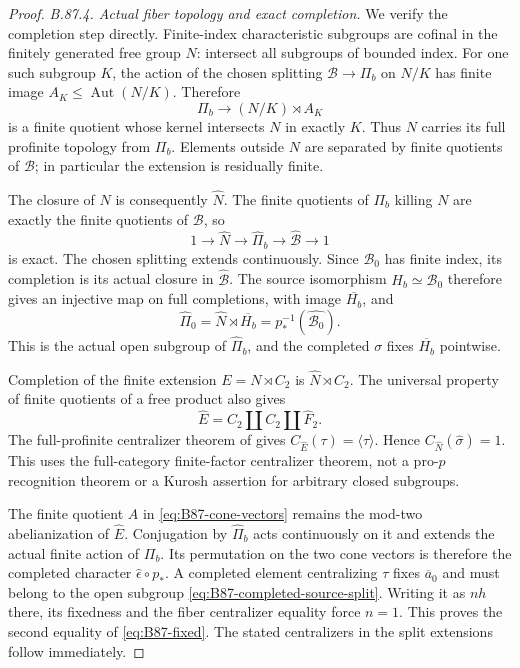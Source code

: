 \begin{proof}
\emph{B.87.4. Actual fiber topology and exact completion.}
We verify the completion step directly. Finite-index characteristic
subgroups are cofinal in the finitely generated free group $N$: intersect
all subgroups of bounded index. For one such subgroup $K$, the action of
the chosen splitting $\mathcal B\to\Pi_b$ on $N/K$ has finite image
$A_K\leq\operatorname{Aut}(N/K)$. Therefore
\[
 \Pi_b\longrightarrow (N/K)\rtimes A_K
\]
is a finite quotient whose kernel intersects $N$ in exactly $K$.
Thus $N$ carries its full profinite topology from $\Pi_b$.
Elements outside $N$ are separated by finite quotients of $\mathcal B$;
in particular the extension is residually finite.

The closure of $N$ is consequently $\widehat N$. The finite quotients
of $\Pi_b$ killing $N$ are exactly the finite quotients of $\mathcal B$,
so
\[
 1\longrightarrow\widehat N\longrightarrow\widehat\Pi_b
       \longrightarrow\widehat{\mathcal B}\longrightarrow1
\]
is exact. The chosen splitting extends continuously. Since
$\mathcal B_0$ has finite index, its completion is its actual closure
in $\widehat{\mathcal B}$. The source isomorphism
$H_b\simeq\mathcal B_0$ therefore gives an injective map on full
completions, with image $\overline{H_b}$, and
\begin{equation}\label{eq:B87-completed-source-split}
 \widehat\Pi_0=\widehat N\rtimes\overline{H_b}
              =p_*^{-1}(\widehat{\mathcal B_0}).
\end{equation}
This is the actual open subgroup of $\widehat\Pi_b$, and the completed
$\sigma$ fixes $\overline{H_b}$ pointwise.

Completion of the finite extension $E=N\rtimes C_2$ is
$\widehat N\rtimes C_2$. The universal property of finite quotients
of a free product also gives
\[
 \widehat E=C_2\amalg C_2\amalg\widehat F_2.
\]
The full-profinite centralizer theorem of
\citet[Theorem B$'$]{A_HR1985} gives
$C_{\widehat E}(\tau)=\langle\tau\rangle$. Hence
$C_{\widehat N}(\widehat\sigma)=1$. This uses the full-category
finite-factor centralizer theorem, not a pro-$p$ recognition theorem or
a Kurosh assertion for arbitrary closed subgroups.

The finite quotient $A$ in \eqref{eq:B87-cone-vectors} remains the
mod-two abelianization of $\widehat E$. Conjugation by
$\widehat\Pi_b$ acts continuously on it and extends the actual finite
action of $\Pi_b$. Its permutation on the two cone vectors is therefore
the completed character $\widehat\epsilon\circ p_*$.
A completed element centralizing $\tau$ fixes $\overline a_0$ and must
belong to the open subgroup \eqref{eq:B87-completed-source-split}.
Writing it as $nh$ there, its fixedness and the fiber centralizer equality
force $n=1$. This proves the second equality of
\eqref{eq:B87-fixed}. The stated centralizers in the split extensions
follow immediately.


\end{proof}
